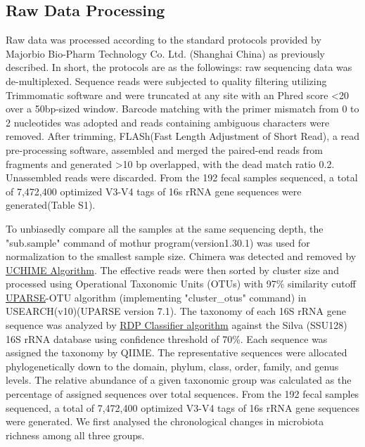 \documentclass[fleqn,10pt]{wlpeerj} %
\begin{document}
  \subsection*{Raw Data Processing}
  Raw data was processed according to the standard protocols provided by Majorbio Bio-Pharm Technology Co. Ltd. (Shanghai China) as previously described\citep{liu2018splenectomy, wang2018bacterial}. In short, the protocols are as the followings:
  raw sequencing data was de-multiplexed. Sequence reads were subjected to quality filtering utilizing Trimmomatic software\citep{bolger2014trimmomatic} and were truncated at any site with an Phred score \textless 20 over a 50bp-sized window. Barcode matching with the primer mismatch from 0 to 2 nucleotides was adopted and reads containing ambiguous characters were removed. After trimming, FLASh(Fast Length Adjustment of Short Read)\citep{magovc2011flash}, a read pre-processing software, assembled and merged the paired-end reads from fragments and generated \textgreater 10 bp overlapped, with the dead match ratio 0.2. Unassembled reads were discarded. From the 192 fecal samples sequenced, a total of 7,472,400 optimized V3-V4 tags of 16s rRNA gene sequences were generated(Table S1).

  To unbiasedly compare all the samples at the same sequencing depth, the "sub.sample" command of mothur program(version1.30.1)\citep{schloss2009introducing} was used for normalization to the smallest sample size. Chimera was detected and removed by \href{https://www.drive5.com/usearch/manual/uchime_algo.html}{UCHIME Algorithm}. The effective reads were then sorted by cluster size and processed using Operational Taxonomic Units (OTUs) with 97\% similarity cutoff \href{http://drive5.com/uparse/}{UPARSE}-OTU algorithm (implementing "cluster\_otus" command)\citep{edgar2013uparse} in USEARCH(v10)(UPARSE version 7.1). The taxonomy of each 16S rRNA gene sequence was analyzed by \href{http://rdp.cme.msu.edu/}{RDP Classifier algorithm}\citep{wang2007naive} against the Silva (SSU128) 16S rRNA database\citep{quast2012silva} using confidence threshold of 70\%. Each sequence was assigned the taxonomy by QIIME\citep{caporaso2010qiime}. The representative sequences were allocated phylogenetically down to the domain, phylum, class, order, family, and genus levels. The relative abundance of a given taxonomic group was calculated as the percentage of assigned sequences over total sequences. From the 192 fecal samples sequenced, a total of 7,472,400 optimized V3-V4 tags of 16s rRNA gene sequences were generated.  We first analysed the chronological changes in microbiota richness among all three groups.
\end{document}
